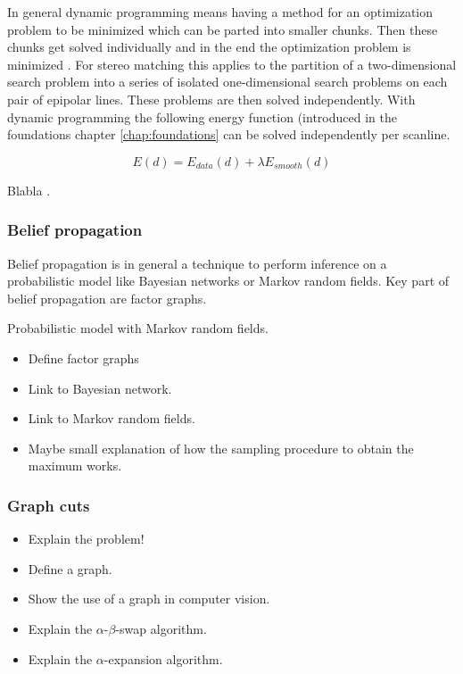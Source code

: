 In general dynamic programming means having a method for an optimization problem to be minimized which can be parted into smaller chunks.
Then these chunks get solved individually and in the end the optimization problem is minimized \citep{angel1972dynamic, bellman2015applied}.
For stereo matching this applies to the partition of a two-dimensional search problem into a series of isolated one-dimensional search problems on each pair of epipolar lines.
These problems are then solved independently.
With dynamic programming the following energy function (introduced in the foundations chapter \ref{chap:foundations} can be solved independently per scanline.

\begin{equation}
  E(d) = E_{data}(d) + \lambda E_{smooth}(d)
\end{equation}

Blabla \citep{cyganek2011introduction}.

\subsubsection{Belief propagation}

Belief propagation is in general a technique to perform inference on a probabilistic model like Bayesian networks or Markov random fields.
Key part of belief propagation are factor graphs.

Probabilistic model with Markov random fields. \citep{yedidia2003understanding}

\begin{itemize}
  \item Define factor graphs
  \item Link to Bayesian network.
  \item Link to Markov random fields.
  \item Maybe small explanation of how the sampling procedure to obtain the maximum works.
\end{itemize}

\subsubsection{Graph cuts}

\begin{itemize}
  \item Explain the problem! \citep{boykov2001fast}
  \item Define a graph.
  \item Show the use of a graph in computer vision.
  \item Explain the $\alpha$-$\beta$-swap algorithm.
  \item Explain the $\alpha$-expansion algorithm.
\end{itemize}

